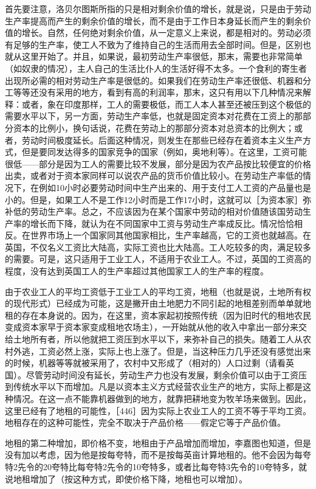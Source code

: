 首先要注意，洛贝尔图斯所指的只是相对剩余价值的增长，就是说，只是由于劳动生产率提高而产生的剩余价值的增长，而不是由于工作日本身延长而产生的剩余价值的增长。自然，任何绝对剩余价值，从一定意义上来说，都是相对的。劳动必须有足够的生产率，使工人不致为了维持自己的生活而用去全部时间。但是，区别也就从这里开始了。并且，如果说，最初劳动生产率很低，那末，需要也非常简单（如奴隶的情况），主人自己的生活比仆人的生活好得不太多。一个食利的寄生者出现所必需的相对劳动生产率是很低的。如果我们在劳动生产率还很低、机器和分工等等还没有采用的地方，看到有高的利润率，那末，这只有用以下几种情况来解释：或者，象在印度那样，工人的需要极低，而工人本人甚至还被压到这个极低的需要水平以下，另一方面，劳动生产率低，也就是固定资本对花费在工资上的那部分资本的比例小，换句话说，花费在劳动上的那部分资本对总资本的比例大；或者，劳动时间极度延长。后面这种情况，则发生在那些已经存在着资本主义生产方式，但是要同发达得多的国家竞争的国家（例如，奥地利等）。在这里，工资可能很低——部分是因为工人的需要比较不发展，部分是因为农产品按比较便宜的价格出卖，或者对于资本家同样可以说农产品的货币价值比较小。在劳动生产率低的情况下，在例如10小时必要劳动时间中生产出来的、用于支付工人工资的产品量也是小的。但是，如果工人不是工作12小时而是工作17小时，这就可以［为资本家］弥补低的劳动生产率。总之，不应该因为在某个国家中劳动的相对价值随该国劳动生产率的增长而下降，就认为在不同国家中工资与劳动生产率成反比。情况恰恰相反。在世界市场上一个国家同其他国家相比，生产率越高，它的工资也就越高。在英国，不仅名义工资比大陆高，实际工资也比大陆高。工人吃较多的肉，满足较多的需要。可是，这只适用于工业工人，不适用于农业工人。不过，英国的工资高的程度，没有达到英国工人的生产率超过其他国家工人的生产率的程度。

由于农业工人的平均工资低于工业工人的平均工资，地租（也就是说，土地所有权的现代形式）已经成为可能，这是撇开由土地肥力不同引起的地租差别而单单就地租的存在本身说的。因为，在这里，资本家起初按照传统（因为旧时代的租地农民变成资本家早于资本家变成租地农场主），一开始就从他的收入中拿出一部分来交给土地所有者，所以他就把工资压到水平以下，来弥补自己的损失。随着工人从农村外逃，工资必然上涨，实际上也上涨了。但是，当这种压力几乎还没有感觉出来的时候，机器等等就被采用了，农村中又形成了（相对的）人口过剩（请看英国）。尽管劳动时间没有延长，劳动生产力也没有发展，剩余价值可以由于工资压到传统水平以下而增加。凡是以资本主义方式经营农业生产的地方，实际上都是这种情况。在这一点不能靠机器做到的地方，就靠把耕地变为牧羊场来做到。因此，这里已经有了地租的可能性，［446］因为实际上农业工人的工资不等于平均工资。地租存在的这种可能性，完全不取决于产品价格——假定它等于产品价值。

地租的第二种增加，即价格不变，地租由于产品增加而增加，李嘉图也知道，但是没有加以考虑，因为他是按每夸特，而不是按每英亩计算地租的。他不会因为每夸特2先令的20夸特比每夸特2先令的10夸特多，或者比每夸特3先令的10夸特多，就说地租增加了（按这种方式，即使价格下降，地租也可以增加）。

